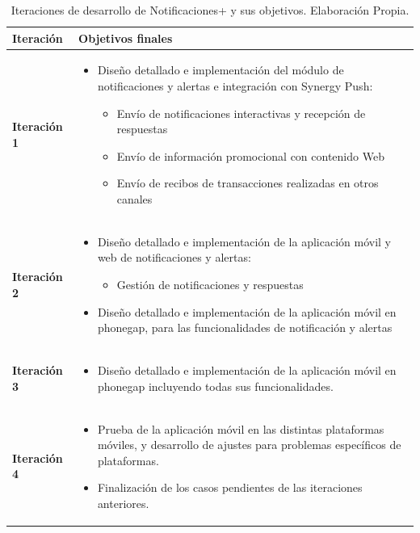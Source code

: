 \begin{table}
\begin{tabular}{| p{2.5cm} | p{13.5cm} |}
\hline 
\bfseries \footnotesize {Iteración} & \bfseries \footnotesize {Objetivos finales} \\ 
\hline 
\bfseries \footnotesize {Iteración 1} & 
\begin{itemize}[noitemsep,nolistsep]
  \item \footnotesize Diseño detallado e implementación del módulo de notificaciones y alertas e integración con Synergy Push:
  \begin{itemize}[noitemsep,nolistsep]
    \item \footnotesize Envío de notificaciones interactivas y recepción de respuestas
    \item \footnotesize Envío de información promocional con contenido Web
    \item \footnotesize Envío de recibos de transacciones realizadas en otros canales
  \end{itemize}
\end{itemize}
\\ \hline 
\bfseries \footnotesize {Iteración 2} & 
\begin{itemize}[noitemsep,nolistsep]
  \item \footnotesize Diseño detallado e implementación de la aplicación móvil y web de notificaciones y alertas:
  \begin{itemize}[noitemsep,nolistsep]
	   \item \footnotesize Gestión de notificaciones y respuestas
  \end{itemize}
  \item \footnotesize  Diseño detallado e implementación de la aplicación móvil en phonegap, para las funcionalidades de notificación y alertas
\end{itemize}
\\ \hline 
\bfseries \footnotesize{Iteración 3} & 
\begin{itemize}[noitemsep,nolistsep]
  \item \footnotesize Diseño detallado e implementación de la aplicación móvil en phonegap incluyendo todas sus funcionalidades. 	
\end{itemize}
\\ \hline 
\bfseries \footnotesize{Iteración 4} & 
\begin{itemize}[noitemsep,nolistsep]
  \item \footnotesize Prueba de la aplicación móvil en las distintas plataformas móviles, y desarrollo de ajustes para problemas específicos de plataformas.
  \item \footnotesize Finalización de los casos pendientes de las iteraciones anteriores.  
\end{itemize}
\\ \hline 
\end{tabular}
\footnotesize \caption{Iteraciones de desarrollo de Notificaciones+ y sus objetivos. Elaboración Propia.}
\label{table:iteraciones}
\end{table}


